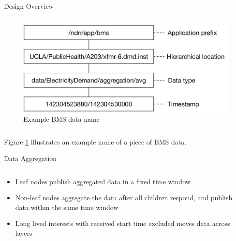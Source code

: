 \documentclass[final,hyperref={pdfpagelabels=false},20pt]{beamer}
\begin{document}
\begin{frame}[t]
\begin{columns}[t]
\begin{column}{.465\textwidth}
\begin{block}{Design Overview}
\begin{columns}[T]
\begin{column}{.55\textwidth}
\begin{figure}
\includegraphics[width=\linewidth]{bms-example-name}
\caption{Example BMS data name}
\label{fig:example-name}
\end{figure}
\end{column}

\end{columns}

\vspace{15mm}

Figure \ref{fig:example-name} illustrates an example name of a piece of BMS data.

\end{block}


\begin{block}{Data Aggregation}

\begin{columns}[T]

\begin{column}{.42\textwidth}
\begin{itemize}
\item{Leaf nodes publish aggregated data in a fixed time window}
\item{Non-leaf nodes aggregate the data after all children respond, and publish data within the same time window}
\item{Long lived interests with received start time excluded moves data across layers}
\end{itemize}
\end{column}


\end{columns}
\end{block}
\end{column}
\end{columns}
\end{frame}
\end{document}
